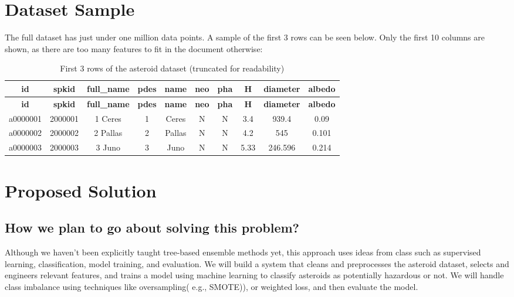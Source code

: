 \documentclass{article}
\begin{document}
\section{Dataset Sample}
The full dataset has just under one million data points.
A sample of the first 3 rows can be seen below.
Only the first 10 columns are shown, as there are too many features to fit in the document otherwise:

\begin{scriptsize}
\begin{longtable}{|c|c|c|c|c|c|c|c|c|c|}
\caption{First 3 rows of the asteroid dataset (truncated for readability)} \\
\hline
\textbf{id} & \textbf{spkid} & \textbf{full\_name} & \textbf{pdes} & \textbf{name} & \textbf{neo} & \textbf{pha} & \textbf{H} & \textbf{diameter} & \textbf{albedo} \\
\hline
\endfirsthead
\hline
\textbf{id} & \textbf{spkid} & \textbf{full\_name} & \textbf{pdes} & \textbf{name} & \textbf{neo} & \textbf{pha} & \textbf{H} & \textbf{diameter} & \textbf{albedo} \\
\hline
\endhead
a0000001 & 2000001 & 1 Ceres & 1 & Ceres & N & N & 3.4 & 939.4 & 0.09 \\
\hline
a0000002 & 2000002 & 2 Pallas & 2 & Pallas & N & N & 4.2 & 545 & 0.101 \\
\hline
a0000003 & 2000003 & 3 Juno & 3 & Juno & N & N & 5.33 & 246.596 & 0.214 \\
\hline
\end{longtable}
\end{scriptsize}
\section{Proposed Solution}

\subsection*{How we plan to go about solving this problem?}
\medskip
Although we haven’t been explicitly taught tree-based ensemble methods yet,
this approach uses ideas from class such as supervised learning, classification,
model training, and evaluation. We will build a system that
cleans and preprocesses the asteroid dataset, selects and engineers relevant
features, and trains a model using machine learning to classify asteroids as potentially hazardous
or not. We will handle class imbalance using techniques like oversampling( e.g., SMOTE)),
or weighted loss, and then evaluate the model.
\end{document}
